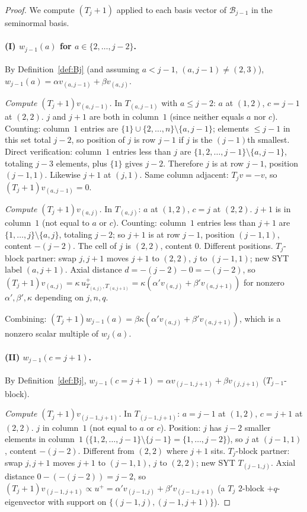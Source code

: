 \documentclass[11pt]{article}
\theoremstyle{definition}
\begin{document}
\begin{proof}
We compute $(T_j{+}1)$ applied to each basis vector of
$\mathcal{B}_{j-1}$ in the seminormal basis.

\paragraph{(I) $w_{j-1}(a)$ for $a \in \{2,\ldots,j-2\}$.}
By Definition~\ref{def:Bj} (and assuming $a < j-1$, $(a, j-1) \ne (2,3)$),
$w_{j-1}(a) = \alpha v_{(a,j-1)} + \beta v_{(a,j)}$.

\emph{Compute $(T_j{+}1)v_{(a,j-1)}$.} In $T_{(a,j-1)}$ with
$a \le j-2$: $a$ at $(1,2)$, $c = j-1$ at $(2,2)$.  $j$ and $j+1$ are
both in column~$1$ (since neither equals $a$ nor $c$).
Counting: column~$1$ entries are $\{1\} \cup \{2,\ldots,n\}\setminus\{a,j-1\}$;
elements $\le j-1$ in this set total $j-2$, so position of $j$ is row
$j-1$ if $j$ is the $(j-1)$th smallest.  Direct verification: column~$1$
entries less than $j$ are $\{1, 2, \ldots, j-1\} \setminus \{a, j-1\}$,
totaling $j - 3$ elements, plus $\{1\}$ gives $j-2$.
Therefore $j$ is at row $j-1$, position $(j-1,1)$.
Likewise $j+1$ at $(j,1)$.  Same column adjacent: $T_jv = -v$, so
$(T_j{+}1)v_{(a,j-1)} = 0$.

\emph{Compute $(T_j{+}1)v_{(a,j)}$.} In $T_{(a,j)}$: $a$ at $(1,2)$,
$c = j$ at $(2,2)$.  $j+1$ is in column~$1$ (not equal to $a$ or
$c$).  Counting: column~$1$ entries less than $j+1$ are
$\{1,\ldots,j\}\setminus\{a,j\}$, totaling $j-2$; so $j+1$ is at row
$j-1$, position $(j-1,1)$, content $-(j-2)$.
The cell of $j$ is $(2,2)$, content $0$.  Different positions.
$T_j$-block partner: swap $j,j+1$ moves $j+1$ to $(2,2)$, $j$ to
$(j-1,1)$; new SYT label $(a, j+1)$.
Axial distance $d = -(j-2) - 0 = -(j-2)$, so
$(T_j{+}1)v_{(a,j)} = \kappa\,u^+_{T_{(a,j)}, T_{(a,j+1)}}
= \kappa(\alpha' v_{(a,j)} + \beta' v_{(a,j+1)})$
for nonzero $\alpha',\beta',\kappa$ depending on $j,n,q$.

Combining: $(T_j{+}1)w_{j-1}(a) = \beta\kappa(\alpha' v_{(a,j)} +
\beta' v_{(a,j+1)})$, which is a nonzero scalar multiple of $w_j(a)$.
\checkmark

\paragraph{(II) $w_{j-1}(c=j+1)$.}
By Definition~\ref{def:Bj}, $w_{j-1}(c=j+1) = \alpha v_{(j-1,j+1)} +
\beta v_{(j,j+1)}$ ($T_{j-1}$-block).

\emph{Compute $(T_j{+}1)v_{(j-1,j+1)}$.} In $T_{(j-1,j+1)}$: $a = j-1$
at $(1,2)$, $c = j+1$ at $(2,2)$.  $j$ in column~$1$ (not equal to
$a$ or $c$).  Position: $j$ has $j-2$ smaller elements in column~$1$
($\{1, 2, \ldots, j-1\} \setminus \{j-1\} = \{1,\ldots,j-2\}$), so
$j$ at $(j-1,1)$, content $-(j-2)$.  Different from $(2,2)$ where
$j+1$ sits.  $T_j$-block partner: swap $j,j+1$ moves $j+1$ to
$(j-1,1)$, $j$ to $(2,2)$; new SYT $T_{(j-1,j)}$.
Axial distance $0 - (-(j-2)) = j-2$, so
$(T_j{+}1)v_{(j-1,j+1)} \propto u^+ = \alpha'v_{(j-1,j)} +
\beta'v_{(j-1,j+1)}$ (a $T_j$ $2$-block $+q$-eigenvector with support
on $\{(j-1,j),(j-1,j+1)\}$).


\end{proof}
\end{document}
